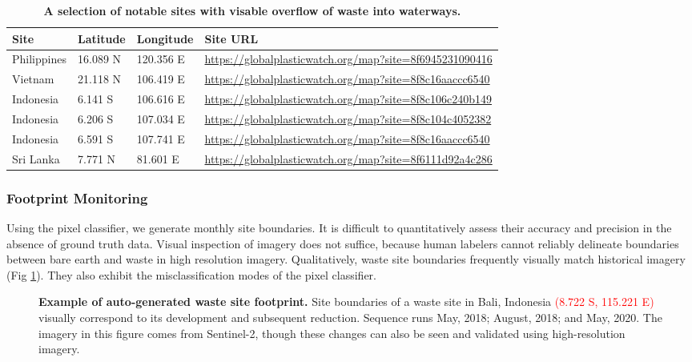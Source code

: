 \documentclass[10pt,letterpaper]{article}
\begin{document}
\begin{table}[!ht]
\begin{adjustwidth}{-2.25in}{0in}
\caption{\textbf{A selection of notable sites with visable overflow of waste into waterways.}}
\label{table:waterside}
\begin{tabular}{@{}llll@{}}
\toprule
\textbf{Site} & \textbf{Latitude} & \textbf{Longitude} & \textbf{Site URL}                                       \\ \midrule
Philippines   & 16.089 N          & 120.356 E          & \url{https://globalplasticwatch.org/map?site=8f6945231090416} \\
Vietnam       & 21.118 N          & 106.419 E          & \url{https://globalplasticwatch.org/map?site=8f8c16aaccc6540} \\
Indonesia     & 6.141 S           & 106.616 E          & \url{https://globalplasticwatch.org/map?site=8f8c106c240b149} \\
Indonesia     & 6.206 S           & 107.034 E          & \url{https://globalplasticwatch.org/map?site=8f8c104c4052382} \\
Indonesia     & 6.591 S           & 107.741 E          & \url{https://globalplasticwatch.org/map?site=8f8c16aaccc6540} \\
Sri Lanka     & 7.771 N           & 81.601 E           & \url{https://globalplasticwatch.org/map?site=8f6111d92a4c286}     \\ \bottomrule
\end{tabular}
\end{adjustwidth}
\end{table}

\subsubsection*{Footprint Monitoring}
Using the pixel classifier, we generate monthly site boundaries. It is difficult to quantitatively assess their accuracy and precision in the absence of ground truth data. Visual inspection of imagery does not suffice, because human labelers cannot reliably delineate boundaries between bare earth and waste in high resolution imagery. Qualitatively, waste site boundaries frequently visually match historical imagery (Fig \ref{fig:contours}). They also exhibit the misclassification modes of the pixel classifier.

\begin{figure}[!h]
    \caption{{\bf Example of auto-generated waste site footprint.}
    Site boundaries of a waste site in Bali, Indonesia \textcolor{red}{(8.722 S, 115.221 E)} visually correspond to its development and subsequent reduction. Sequence runs May, 2018; August, 2018; and May, 2020. The imagery in this figure comes from Sentinel-2, though these changes can also be seen and validated using high-resolution imagery.}
    \label{fig:contours}
\end{figure}
\end{document}
